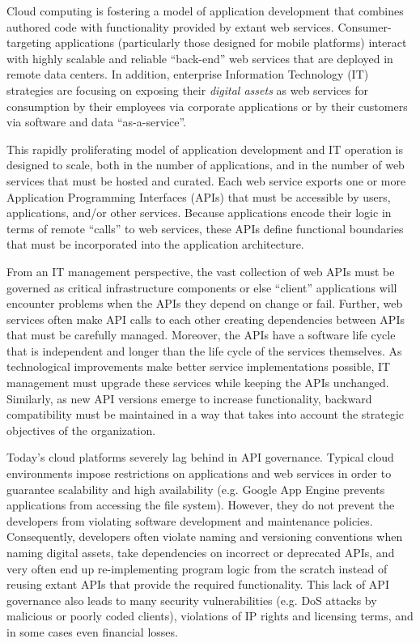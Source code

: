 Cloud computing is fostering a model of 
application development that combines authored code with functionality
provided by extant web services.  Consumer-targeting applications 
(particularly those designed for mobile platforms) interact with highly
scalable and reliable ``back-end'' web services that are deployed
in remote data centers.  In addition, enterprise
Information Technology (IT) strategies are focusing on 
exposing their {\em digital assets} as
web services for consumption
by their employees via corporate applications or
by their customers via software and data ``as-a-service''.

This rapidly proliferating model of application development and IT operation
is designed to scale, both in the number of applications, 
and in the number of web services that must be
hosted and curated.  Each web service exports one or more Application Programming
Interfaces (APIs) that must be accessible by users, applications, and/or
other services.
Because applications encode their logic in terms of
remote ``calls'' to web services,
these APIs define functional boundaries that must be incorporated into the
application architecture.  

From an IT management perspective, the vast collection of web APIs must be
governed as critical infrastructure components or else ``client'' applications
will encounter problems when the APIs they depend on change or fail.  
Further, web services often make API calls to each other 
creating dependencies between APIs that must be carefully managed.
Moreover, the APIs have a software life cycle that is
independent and longer than the life cycle of the services themselves. 
As technological improvements make better service implementations possible, IT
management must upgrade these services while keeping the APIs unchanged.
Similarly, as new API versions emerge to increase functionality, backward
compatibility must be maintained in a way that takes into
account the strategic objectives of the organization.  

Today's cloud platforms severely lag behind in 
API governance. Typical cloud environments impose restrictions
on applications and web services in order to guarantee scalability
and high availability (e.g. Google App Engine prevents applications from accessing
the file system). 
However, they do not prevent the developers from violating
software development and maintenance policies. 
Consequently, developers often violate naming and versioning conventions
when naming digital assets, take dependencies
on incorrect or deprecated APIs, and very often end up re-implementing program logic
from the scratch instead of reusing extant APIs that provide the required functionality.
This lack of API governance also leads to many security vulnerabilities (e.g. DoS attacks
by malicious or poorly coded clients), violations of IP rights and licensing terms, and in
some cases even financial losses. 

